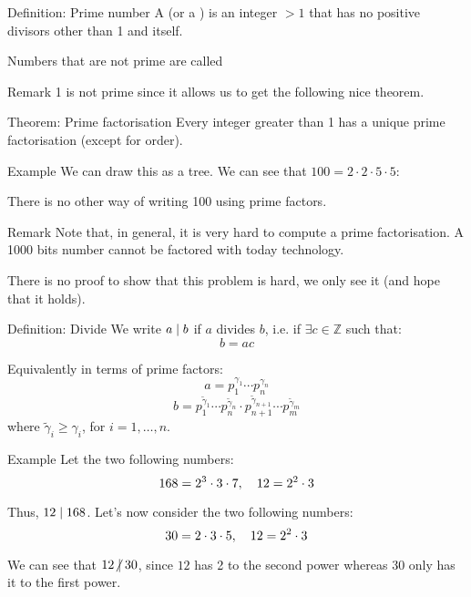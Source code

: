 \documentclass[a4paper]{article}
\begin{document}
\begin{parag}{Definition: Prime number}
    A  (or a ) is an integer $> 1$ that has no positive divisors other than 1 and itself. 

    Numbers that are not prime are called 

    \begin{subparag}{Remark}
        1 is not prime since it allows us to get the following nice theorem.
    \end{subparag}
\end{parag}

\begin{parag}{Theorem: Prime factorisation}
    Every integer greater than 1 has a unique prime factorisation (except for order).

    \begin{subparag}{Example}
        We can draw this as a tree. We can see that $100 = 2\cdot 2\cdot 5\cdot 5$:

        There is no other way of writing 100 using prime factors.
    \end{subparag}

    \begin{subparag}{Remark}
        Note that, in general, it is very hard to compute a prime factorisation. A 1000 bits number cannot be factored with today technology. 

        There is no proof to show that this problem is hard, we only see it (and hope that it holds). 
    \end{subparag}
\end{parag}


\begin{parag}{Definition: Divide}
    We write $a \mid b$ if $a$ divides $b$, i.e. if $\exists c \in \mathbb{Z}$ such that: 
    \[b = ac\]
    
    Equivalently in terms of prime factors: 
    \[a = p_1^{\gamma_1} \cdots p_n^{\gamma_n}\]
    \[b = p_1^{\widetilde{\gamma}_1} \cdots p_n^{\widetilde{\gamma}_n} \cdot p_{n+1}^{\widetilde{\gamma}_{n+1}} \cdots p_m^{\widetilde{\gamma}_m}\]
    where $\widetilde{\gamma}_i \geq \gamma_i$, for $i = 1, \ldots, n$.
\end{parag}

\begin{parag}{Example}
    Let the two following numbers: 
    \[168 = 2^3 \cdot 3 \cdot 7, \quad 12 = 2^2 \cdot 3\]
    
    Thus, $12 \mid 168$. Let's now consider the two following numbers: 
    \[30 = 2\cdot 3\cdot 5, \quad 12 = 2^2 \cdot 3\]
    
    We can see that $12 \ndivides 30$, since $12$ has 2 to the second power whereas 30 only has it to the first power.
\end{parag}
\end{document}
